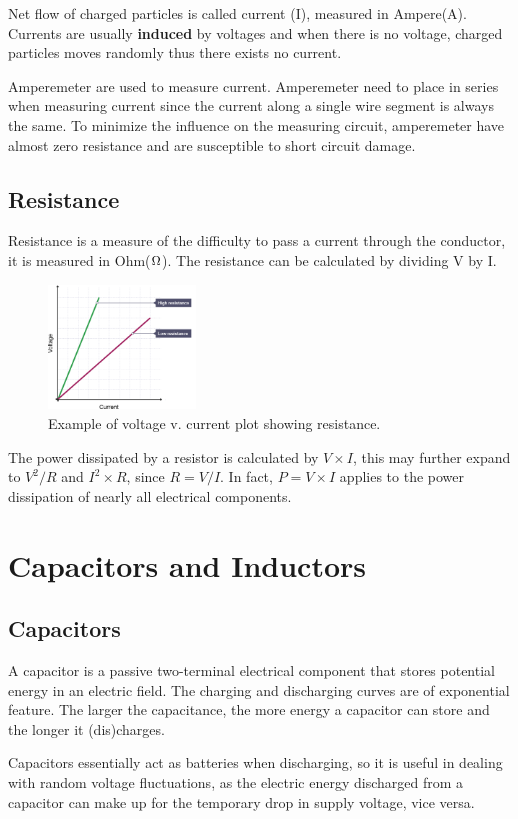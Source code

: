 \documentclass{article}
\begin{document}
Net flow of charged particles is called current (I), measured in Ampere(A). Currents are usually \textbf{induced} by voltages and when there is no voltage, charged particles moves randomly thus there exists no current. \par
Amperemeter are used to measure current. Amperemeter need to place in series when measuring current since the current along a single wire segment is always the same. To minimize the influence on the measuring circuit, amperemeter have almost zero resistance and are susceptible to short circuit damage.

\subsection{Resistance}

Resistance is a measure of the difficulty to pass a current through the conductor, it is measured in Ohm($\ohm$). The resistance can be calculated by dividing V by I. \par

\begin{figure}[!h]
	\center
	\includegraphics[width=0.35\textwidth, keepaspectratio]{rvi}
	\caption{Example of voltage v. current plot showing resistance.}
	\label{fig:rvi}
\end{figure}

The power dissipated by a resistor is calculated by $V\times I$, this may further expand to $V^2/R$ and $I^2\times R$, since $R=V/I$. In fact, $P=V\times I$ applies to the power dissipation of nearly all electrical components.

\section{Capacitors and Inductors}
\subsection{Capacitors}

A capacitor is a passive two-terminal electrical component that stores potential energy in an electric field. The charging and discharging curves are of exponential feature. The larger the capacitance, the more energy a capacitor can store and the longer it (dis)charges. \par 
Capacitors essentially act as batteries when discharging, so it is useful in dealing with random voltage fluctuations, as the electric energy discharged from a capacitor can make up for the temporary drop in supply voltage, vice versa.
\end{document}
